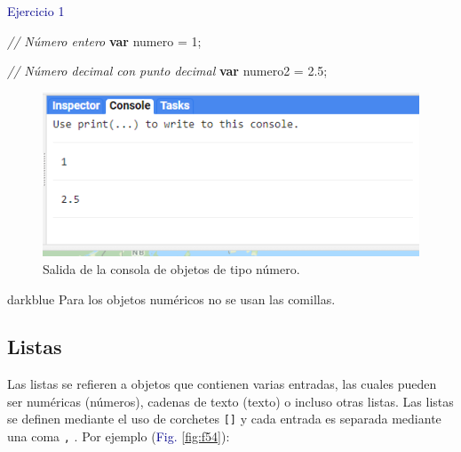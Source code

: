 \documentclass[
  12pt,
  letterpaper,
  twoside]{book}
\newenvironment{Shaded}{\begin{snugshade}}{\end{snugshade}}
\newcommand{\CommentTok}[1]{\textcolor[rgb]{0.24,0.58,0.00}{\textit{#1}}}
\newcommand{\ControlFlowTok}[1]{\textcolor[rgb]{0.00,0.00,0.00}{\textbf{#1}}}
\newcommand{\DecValTok}[1]{\textcolor[rgb]{0.28,0.53,0.93}{#1}}
\newcommand{\FloatTok}[1]{\textcolor[rgb]{0.28,0.53,0.93}{#1}}
\newcommand{\NormalTok}[1]{#1}
\newcommand{\OperatorTok}[1]{\textcolor[rgb]{0.00,0.00,0.00}{#1}}
\begin{document}
\textcolor{darkblue}{Ejercicio 1}

\begin{Shaded}
\begin{Highlighting}[]
\CommentTok{// Número entero}
\ControlFlowTok{var}\NormalTok{ numero }\OperatorTok{=} \DecValTok{1}\OperatorTok{;} 
 
\CommentTok{// Número decimal con punto decimal  }
\ControlFlowTok{var}\NormalTok{ numero2 }\OperatorTok{=} \FloatTok{2.5}\OperatorTok{;}  
\end{Highlighting}
\end{Shaded}

\begin{figure}[H]

{\centering \includegraphics[width=0.95\linewidth]{Img/ej1} 

}

\caption{Salida de la consola de objetos de tipo número.}\label{fig:f53}
\end{figure}

\begin{bluebox2}

\begin{awesomeblock}{5pt}{\faLightbulb}{darkblue}
Para los objetos numéricos no se usan las comillas.

\end{awesomeblock}

\end{bluebox2}

\hypertarget{listas}{%
\subsection*{Listas}\label{listas}}

Las listas se refieren a objetos que contienen varias entradas, las cuales pueden ser numéricas (números), cadenas de texto (texto) o incluso otras listas. Las listas se definen mediante el uso de corchetes \texttt{{[}{]}} y cada entrada es separada mediante una coma \texttt{,} . Por ejemplo (\textcolor{darkblue}{Fig.} \ref{fig:f54}):
\end{document}
